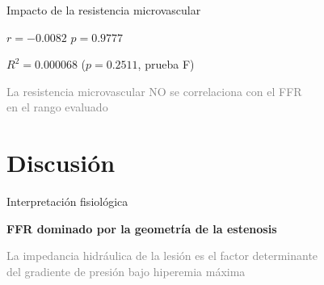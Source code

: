 \documentclass[aspectratio=169, 11pt]{beamer}
\begin{document}
\begin{frame}{Impacto de la resistencia microvascular}

  \centering
  \vfill
  \textbf{$r = -0.0082$} \quad $p = 0.9777$

  \vspace{0.2cm}
  \textbf{$R^2 = 0.000068$} \quad ($p = 0.2511$, prueba F)

  \vspace{0.5cm}
  \textcolor{gray}{\small La resistencia microvascular NO se correlaciona con el FFR \\ en el rango evaluado}
  \vfill
\end{frame}

%

\section{Discusión}

\begin{frame}{Interpretación fisiológica}

  \centering
  \vfill
  {\large\textbf{FFR dominado por la geometría de la estenosis}}

  \vspace{0.5cm}
  \textcolor{gray}{\small La impedancia hidráulica de la lesión es el factor determinante \\ del gradiente de presión bajo hiperemia máxima}

  \vfill
\end{frame}
\end{document}
